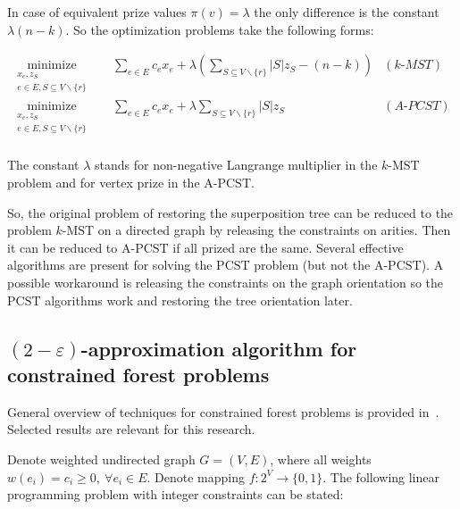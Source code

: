 \documentclass[11pt, tightenlines, twoside, onecolumn, nofloats, nobibnotes, nofootinbib, superscriptaddress, noshowpacks, centertags]{revtex4}
\begin{document}
In case of equivalent prize values $\pi(v) = \lambda$ the only difference is the constant $\lambda(n-k)$. So the optimization problems take the following forms:

\begin{align*}
\underset{\substack{x_e,z_S \\ e\in E, S\subseteq V\backslash \{r\}}}{\text{minimize}}\quad & \sum\limits_{e\in E}c_ex_e +  \lambda\left(\sum\limits_{S\subseteq V\backslash \{r\}}|S|z_S - (n-k)\right) & (k\text{-}MST)  \nonumber\\
\underset{\substack{x_e,z_S \\ e\in E, S\subseteq V\backslash \{r\}}}{\text{minimize}}\quad & \sum\limits_{e\in E}c_ex_e +  \lambda\sum\limits_{S\subseteq V\backslash\{r\}}|S|z_S & (A\text{-}PCST) \nonumber\\
\end{align*}

The constant $\lambda$ stands for non-negative Langrange multiplier in the $k\text{-MST}$ problem and for vertex prize in the $\text{A}$-$\text{PCST}$.

So, the original problem of restoring the superposition tree can be reduced to the problem $k\text{-MST}$ on a directed graph by releasing the constraints on arities. Then it can be reduced to $\text{A}$-$\text{PCST}$ if all prized are the same. Several effective algorithms are present for solving the $\text{PCST}$ problem (but not the $\text{A}$-$\text{PCST}$). A possible workaround is releasing the constraints on the graph orientation so the $\text{PCST}$ algorithms work and restoring the tree orientation later.

\subsection[\texorpdfstring{$(2-\varepsilon)$-approximation algorithm for constrained forest problems}
{$(2-\varepsilon)$-approximation algorithm for constrained forest problems}]
{$(2-\varepsilon)$-approximation algorithm for constrained forest problems}

General overview of techniques for constrained forest problems is provided in~\cite{goemans1995general}. Selected results are relevant for this research.

Denote weighted undirected graph $G=(V,E)$, where all weights $w(e_i)=c_i\geqslant 0,~\forall e_i\in E$. Denote mapping $f:2^{V}\to \{0, 1\}$. The following linear programming problem with integer constraints can be stated:
\end{document}
